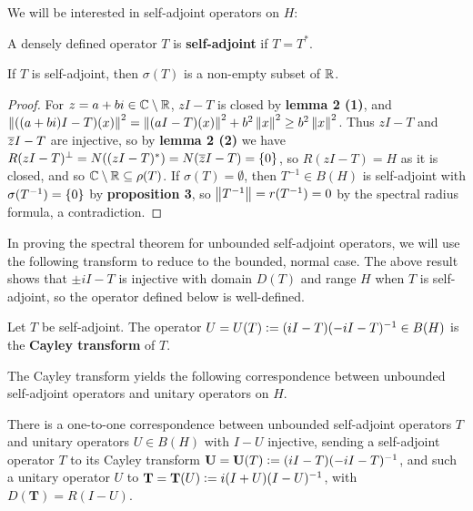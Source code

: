 \documentclass[10pt]{amsart}
\begin{document}
We will be interested in self-adjoint operators on $H$:
\begin{definition}
    A densely defined operator $T$ is \textbf{self-adjoint} if $T = T^*$.
\end{definition}
\begin{lemma}
    If $T$ is self-adjoint, then $\sigma(T)$ is a non-empty subset of $\mathbb{R}$.
\end{lemma}
\begin{proof}
    For $z = a + bi \in \mathbb{C} \setminus \mathbb{R}$, $zI - T$ is closed by \textbf{lemma 2 (1)}, and $\left\| ((a + bi)I - T)(x) \right\|^2 = \left\| (aI - T)(x) \right\|^2 + b^2\left\| x \right\|^2 \geq b^2\left\| x \right\|^2$. Thus $zI - T$ and $\overline{z}I - T$ are injective, so by \textbf{lemma 2 (2)} we have $R(zI - T)^\perp = N((zI - T)^*) = N(\overline{z} I - T) = \left\{  0  \right\}$, so $R(zI - T) = H$ as it is closed, and so $\mathbb{C} \setminus \mathbb{R} \subseteq \rho(T)$. If $\sigma(T) = \emptyset$, then $T^{-1} \in B(H)$ is self-adjoint with $\sigma(T^{-1}) = \left\{  0  \right\}$ by \textbf{proposition 3}, so $\left\| T^{-1} \right\| = r(T^{-1}) = 0$ by the spectral radius formula, a contradiction.
\end{proof}
In proving the spectral theorem for unbounded self-adjoint operators, we will use the following transform to reduce to the bounded, normal case. The above result shows that $\pm iI - T$ is injective with domain $D(T)$ and range $H$ when $T$ is self-adjoint, so the operator defined below is well-defined.
\begin{definition}
    Let $T$ be self-adjoint. The operator $U = U(T) \vcentcolon= (iI - T)(-iI - T)^{-1} \in B(H)$ is the \textbf{Cayley transform} of $T$.
\end{definition}
The Cayley transform yields the following correspondence between unbounded self-adjoint operators and unitary operators on $H$.
\begin{proposition}\label{corresp}
    There is a one-to-one correspondence between unbounded self-adjoint operators $T$ and unitary operators $U \in B(H)$ with $I - U$ injective, sending a self-adjoint operator $T$ to its Cayley transform $\mathbf U = \mathbf U(T) \vcentcolon= (iI - T)(-iI - T)^{-1}$, and such a unitary operator $U$ to $\mathbf T = \mathbf T(U) \vcentcolon= i(I + U)(I - U)^{-1}$, with $D(\mathbf T) = R(I - U)$.
\end{proposition}
\end{document}
